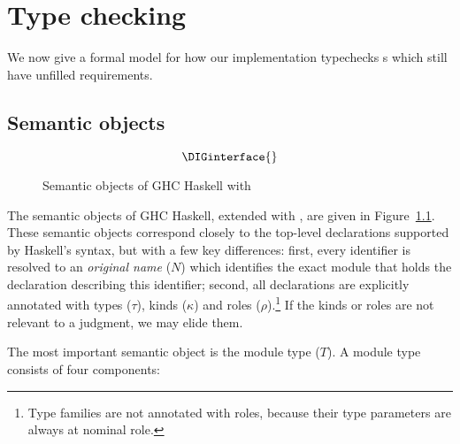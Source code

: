 \chapter{Type checking}
\label{sec:compiler}

We now give a formal model for how our implementation typechecks
\unit{}s which still have unfilled requirements.


\section{Semantic objects}
\label{sec:semantic-objects}

\begin{figure}
\[ \DIGinterface{} \]
\caption{Semantic objects of GHC Haskell with \Backpack{}}
\label{fig:semantic-objects}
\end{figure}

The semantic objects of GHC Haskell, extended with \Backpack{}, are
given in Figure~\ref{fig:semantic-objects}.  These semantic objects
correspond closely to the top-level declarations supported by
Haskell's syntax, but with a few key differences: first, every
identifier is resolved to an \emph{original name} ($N$) which identifies
the exact module that holds the declaration describing this identifier;
second, all declarations are explicitly annotated with types ($\tau$), kinds ($\kappa$) and
roles ($\rho$).\footnote{Type families are not annotated with roles, because their
type parameters are always at nominal role.}  If the kinds or roles are not
relevant to a judgment, we may elide them.

The most important semantic object is the module type ($T$).  A module
type consists of four components:

